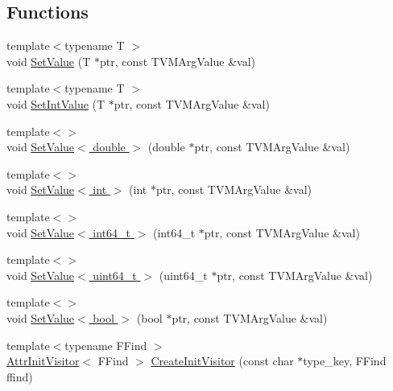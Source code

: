 \subsection*{Functions}
\begin{DoxyCompactItemize}
\item 
{\footnotesize template$<$typename T $>$ }\\void \hyperlink{namespacetvm_1_1detail_ae91709b0cb7daf1bca69432bee0a3568}{Set\+Value} (T $\ast$ptr, const T\+V\+M\+Arg\+Value \&val)
\item 
{\footnotesize template$<$typename T $>$ }\\void \hyperlink{namespacetvm_1_1detail_af7e68b984c27ffe1726578bc9cc59322}{Set\+Int\+Value} (T $\ast$ptr, const T\+V\+M\+Arg\+Value \&val)
\item 
{\footnotesize template$<$$>$ }\\void \hyperlink{namespacetvm_1_1detail_a2565d82719660de2ab39178c917d6628}{Set\+Value$<$ double $>$} (double $\ast$ptr, const T\+V\+M\+Arg\+Value \&val)
\item 
{\footnotesize template$<$$>$ }\\void \hyperlink{namespacetvm_1_1detail_a107ebbb0ef4a94f47cd25cb2213dcd96}{Set\+Value$<$ int $>$} (int $\ast$ptr, const T\+V\+M\+Arg\+Value \&val)
\item 
{\footnotesize template$<$$>$ }\\void \hyperlink{namespacetvm_1_1detail_ad20586749a52e831a52c20984a926d67}{Set\+Value$<$ int64\+\_\+t $>$} (int64\+\_\+t $\ast$ptr, const T\+V\+M\+Arg\+Value \&val)
\item 
{\footnotesize template$<$$>$ }\\void \hyperlink{namespacetvm_1_1detail_acb3382242cbf538f64edae13e4ec5a84}{Set\+Value$<$ uint64\+\_\+t $>$} (uint64\+\_\+t $\ast$ptr, const T\+V\+M\+Arg\+Value \&val)
\item 
{\footnotesize template$<$$>$ }\\void \hyperlink{namespacetvm_1_1detail_addd17cedbd26f5b4b257d7651ca5b6fe}{Set\+Value$<$ bool $>$} (bool $\ast$ptr, const T\+V\+M\+Arg\+Value \&val)
\item 
{\footnotesize template$<$typename F\+Find $>$ }\\\hyperlink{classtvm_1_1detail_1_1AttrInitVisitor}{Attr\+Init\+Visitor}$<$ F\+Find $>$ \hyperlink{namespacetvm_1_1detail_abe71237e8e483fd9277356234eca35d4}{Create\+Init\+Visitor} (const char $\ast$type\+\_\+key, F\+Find ffind)
\end{DoxyCompactItemize}


